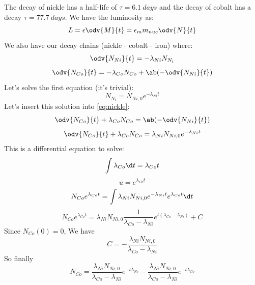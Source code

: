 The decay of nickle has a half-life of $\tau = \qty{6.1}{days}$ and the decay of cobalt has a decay $\tau = \qty{77.7}{days}$. 
We have the luminosity as:
\begin{equation}
    L = \epsilon \odv{M}{t} = \epsilon_m m_{nuc}\odv{N}{t}
\end{equation}
We also have our decay chains (nickle - cobalt - iron) where:
\begin{equation}
    \odv{N_{Ni}}{t} = -\lambda_{Ni}N_{N_i}
    \label{eq:nickle}
\end{equation}
\begin{equation}
    \odv{N_{Co}}{t} = -\lambda_{Co}N_{Co} + \ab(-\odv{N_{Ni}}{t})
    \label{eq:cobalt}
\end{equation}
Let's solve the first equation (it's trivial):
\begin{equation}
    N_{N_i} = N_{Ni,0} e^{-\lambda_{Ni} t}
\end{equation}
Let's insert this solution into \ref{eq:nickle}:
\begin{equation}
    \odv{N_{Co}}{t} + \lambda_{Co}N_{Co} = \ab(-\odv{N_{Ni}}{t})
\end{equation}
\begin{equation}
    \odv{N_{Co}}{t} + \lambda_{Co}N_{Co} = \lambda_{Ni} N_{Ni,0} e^{-\lambda_{Ni} t}
\end{equation}
This is a differential equation to solve:
\begin{equation}
    \int\lambda_{Co} \d t = \lambda_{Co}t
\end{equation}
\begin{equation}
    u = e^{\lambda_{Co}t}
\end{equation}
\begin{equation}
    N_{Co} e^{\lambda_{Co}t} = \int \lambda_{Ni} N_{Ni,0} e^{-\lambda_{Ni} t} e^{\lambda_{Co}t} \d t
\end{equation}
\begin{equation}
    N_{Co}e^{\lambda_{Co}t} = \lambda_{Ni} N_{Ni,0} \frac{1}{\lambda_{Co} - \lambda_{Ni}} e^{t(\lambda_{Co} - \lambda_{Ni})} + C
\end{equation}
Since $N_{Co}(0) = 0$, We have
\begin{equation}
    C = -\frac{\lambda_{Ni} N_{Ni,0}}{\lambda_{Co} - \lambda_{Ni}}
\end{equation}
So finally
\begin{equation}
    N_{Co} = \frac{\lambda_{Ni} N_{Ni,0}}{\lambda_{Co} - \lambda_{Ni}}e^{-t\lambda_{Ni}} -\frac{\lambda_{Ni} N_{Ni,0}}{\lambda_{Co} - \lambda_{Ni}}e^{-t\lambda_{Co}}
\end{equation}
